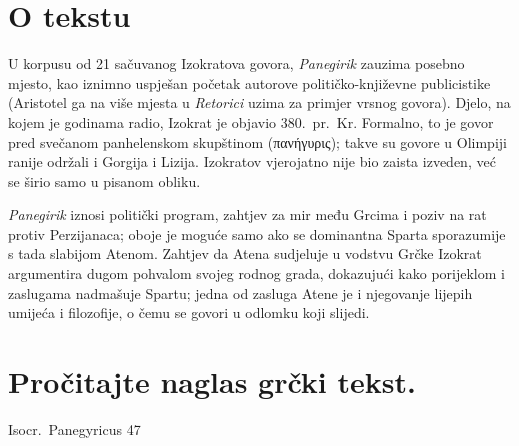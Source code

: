

\section*{O tekstu}

U korpusu od 21 sačuvanog Izokratova govora, \textit{Panegirik} zauzima posebno mjesto, kao iznimno uspješan početak autorove političko-književne publicistike (Aristotel ga na više mjesta u \textit{Retorici} uzima za primjer vrsnog govora). Djelo, na kojem je godinama radio, Izokrat je objavio 380.\ pr.~Kr. Formalno, to je govor pred svečanom panhelenskom skupštinom \textgreek[variant=ancient]{(πανήγυρις);} takve su govore u Olimpiji ranije održali i Gorgija i Lizija. Izokratov vjerojatno nije bio zaista izveden, već se širio samo u pisanom obliku. 

\textit{Panegirik} iznosi politički program, zahtjev za mir među Grcima i poziv na rat protiv Perzijanaca; oboje je moguće samo ako se dominantna Sparta sporazumije s tada slabijom Atenom. Zahtjev da Atena sudjeluje u vodstvu Grčke Izokrat argumentira dugom pohvalom svojeg rodnog grada, dokazujući kako porijeklom i zaslugama nadmašuje Spartu; jedna od zasluga Atene je i njegovanje lijepih umijeća i filozofije, o čemu se govori u odlomku koji slijedi.

\newpage

\section*{Pročitajte naglas grčki tekst.}

Isocr.\ Panegyricus 47


\medskip

